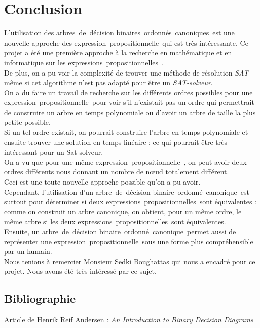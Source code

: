 \documentclass[a4paper, oneside]{report}
\newcommand{\adb}{arbre~de~décision binaire~}
\newcommand{\adbs}{arbres~de~décision binaires~}
\newcommand{\adbo}{\adb ordonné~}
\newcommand{\adbos}{\adbs ordonnés~}
\newcommand{\adboc}{\adbo canonique~}
\newcommand{\adbocs}{\adbos canoniques~}
\newcommand{\expp}{expression~propositionnelle~}
\newcommand{\expps}{expressions~propositionnelles~}
\begin{document}
\chapter*{Conclusion}
L'utilisation des \adbocs est une nouvelle approche des \expp qui est très intéressante. Ce projet a été une première approche à la recherche en mathématique et en informatique sur les \expps.\\
De plus, on a pu voir la complexité de trouver une méthode de résolution \textit{SAT} même si cet algorithme n'est pas adapté pour être un \textit{SAT-solveur}.\\
On a du faire un travail de recherche sur les différents ordres possibles pour une \expp pour voir s'il n'existait pas un ordre qui permettrait de construire un arbre en temps polynomiale ou d'avoir un arbre de taille la plus petite possible.\\
Si un tel ordre existait, on pourrait construire l'arbre en temps polynomiale et ensuite trouver une solution en temps linéaire : ce qui pourrait être très intéressant pour un Sat-solveur.\\
On a vu que pour une même \expp, on peut avoir deux ordres différents nous donnant un nombre de nœud totalement différent.\\
Ceci est une toute nouvelle approche possible qu'on a pu avoir.\\
Cependant, l'utilisation d'un \adboc est surtout pour déterminer si deux \expps sont équivalentes : comme on construit un arbre canonique, on obtient, pour un même ordre, le même arbre si les deux \expps sont équivalentes.\\
Ensuite, un \adboc permet aussi de représenter une \expp sous une forme plus compréhensible par un humain.\\
Nous tenions à remercier Monsieur Sedki Boughattas qui nous a encadré pour ce projet. Nous avons été très intéressé par ce sujet.

\section*{Bibliographie}
Article de Henrik Reif Andersen : \textit{An Introduction to Binary Decision Diagrams}
\end{document}
